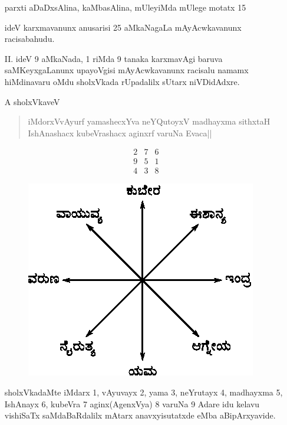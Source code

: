\begin{enumerate}
parxti aDaDxsAlina, kaMbasAlina, mUleyiMda mUlege motatx {\rm 15}

ideV karxmavanunx anusarisi {\rm 25} aMkaNagaLa mAyAcwkavanunx racisabahudu.

\item[{\rm II.}] ideV {\rm 9} aMkaNada, {\rm 1} riMda {\rm 9} tanaka karxmavAgi baruva saMKeyxgaLanunx upayoVgisi mAyAcwkavanunx racisalu namamx hiMdinavaru oMdu sholxVkada rUpadalilx sUtarx niVDidAdxre.

A sholxVkaveV 
\begin{verse}
iMdorxVvAyurf yamashecxYva neYQutoyxV madhayxma sithxtaH\\ 
IshAnashacx kubeVrashacx aginxrf varuNa Evaca||
\end{verse}
$$
\begin{matrix}
2 & 7 & 6\\
9 & 5 & 1\\
4 & 3 & 8
\end{matrix}
$$

\begin{figure}[H]
\centering
\includegraphics[scale=.8]{src/figures/m_117.eps}
\end{figure}

sholxVkadaMte iMdarx {\rm 1}, vAyuvayx {\rm 2}, yama {\rm 3}, neYrutayx {\rm 4}, madhayxma {\rm 5}, IshAnayx {\rm 6}, kubeVra {\rm 7} aginx(AgenxVya) {\rm 8} varuNa {\rm 9} Adare idu kelavu vishiSaTx saMdaBaRdalilx mAtarx anavxyisutatxde eMba aBipArxyavide.


\end{enumerate}
